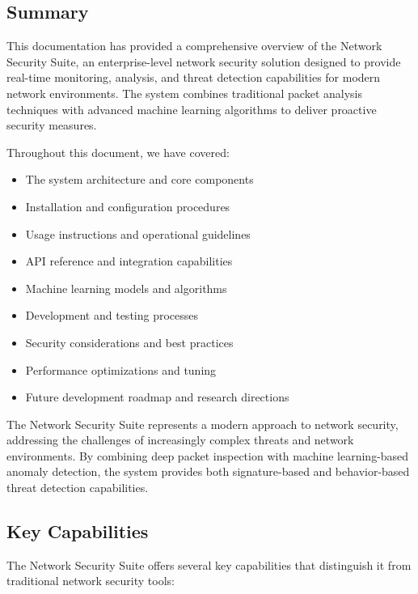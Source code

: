 \subsection{Summary}
This documentation has provided a comprehensive overview of the Network Security Suite, an enterprise-level network security solution designed to provide real-time monitoring, analysis, and threat detection capabilities for modern network environments. The system combines traditional packet analysis techniques with advanced machine learning algorithms to deliver proactive security measures.

Throughout this document, we have covered:

\begin{itemize}
    \item The system architecture and core components
    \item Installation and configuration procedures
    \item Usage instructions and operational guidelines
    \item API reference and integration capabilities
    \item Machine learning models and algorithms
    \item Development and testing processes
    \item Security considerations and best practices
    \item Performance optimizations and tuning
    \item Future development roadmap and research directions
\end{itemize}

The Network Security Suite represents a modern approach to network security, addressing the challenges of increasingly complex threats and network environments. By combining deep packet inspection with machine learning-based anomaly detection, the system provides both signature-based and behavior-based threat detection capabilities.

\subsection{Key Capabilities}
The Network Security Suite offers several key capabilities that distinguish it from traditional network security tools:

